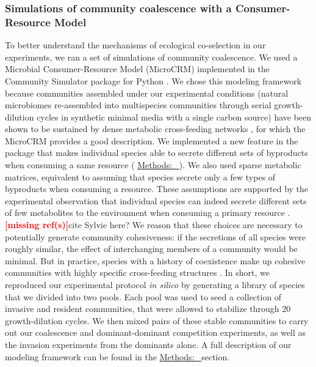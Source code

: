 \documentclass[a4paper,10pt]{article}
\newcommand{\mr}{\textcolor{red}{\textbf{[missing ref(s)]}}}
\newcommand{\methodsref}[1]{%
  \hyperref[{methods:#1}]{%
   Methods:~\nameref*{methods:#1}%
  }%
}
\begin{document}
\subsubsection*{Simulations of community coalescence with a Consumer-Resource Model}

To better understand the mechanisms of ecological co-selection in our experiments,
we ran a set of simulations of community coalescence. We used a Microbial Consumer-Resource
Model (MicroCRM) \cite{Goldford2018,Marsland2019} implemented in the Community Simulator package
for Python \cite{Marsland2020}. We chose this modeling framework because
communities assembled under our experimental conditions (natural microbiomes re-assembled into
multispecies communities through serial growth-dilution cycles in synthetic minimal media
with a single carbon source)
have been shown to be
sustained by dense metabolic cross-feeding networks
\cite{Goldford2018,Estrela2020},
for which the MicroCRM provides a good description.
We implemented a new feature in the package that makes individual species
able to secrete different sets of byproducts when consuming a same resource
(\methodsref{sim}).
We also used sparse metabolic matrices, equivalent to assuming that species secrete only a few
types of byproducts when consuming a resource. These assumptions are supported by the experimental
observation that individual species can indeed secrete different sets of few metabolites
to the environment when consuming a primary resource
\cite{Harcombe2014,Pinu2018}. \mr cite Sylvie here?
We reason that these choices are necessary to potentially generate community cohesiveness:
if the secretions of all species were roughly similar, the effect of interchanging members of
a community would be minimal. But in practice, species with a history of coexistence make up
cohesive communities with highly specific cross-feeding structures \cite{Goldford2018,Estrela2020}.
In short,
we reproduced our experimental protocol \textit{in silico}
by generating a library of species that we divided into two pools. Each pool was used to seed a
collection of invasive and resident communities, that were allowed to stabilize through 20
growth-dilution cycles. We then mixed pairs of these stable communities to carry out our coalescence
and dominant-dominant competition experiments,
as well as the invasion experiments from the dominants alone.
A full description of our modeling framework can be found in the \methodsref{sim} section.
\end{document}
